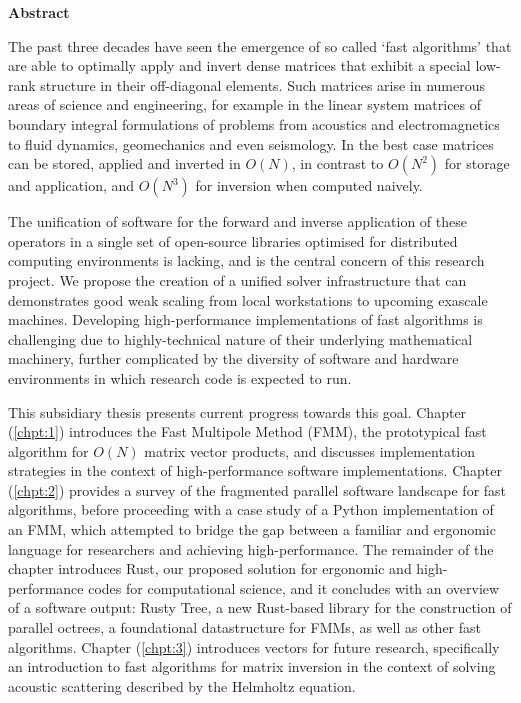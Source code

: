 \thispagestyle{plain}

\begin{center}
    \textbf{Abstract}
\end{center}

The past three decades have seen the emergence of so called `fast algorithms' that are able to optimally apply and invert dense matrices that exhibit a special low-rank structure in their off-diagonal elements. Such matrices arise in numerous areas of science and engineering, for example in the linear system matrices of boundary integral formulations of problems from acoustics and electromagnetics to fluid dynamics, geomechanics and even seismology. In the best case matrices can be stored, applied and inverted in $O(N)$, in contrast to $O(N^2)$ for storage and application, and $O(N^3)$ for inversion when computed naively.

The unification of software for the forward and inverse application of these operators in a single set of open-source libraries optimised for distributed computing environments is lacking, and is the central concern of this research project. We propose the creation of a unified solver infrastructure that can demonstrates good weak scaling from local workstations to upcoming exascale machines. Developing high-performance implementations of fast algorithms is challenging due to highly-technical nature of their underlying mathematical machinery, further complicated by the diversity of software and hardware environments in which research code is expected to run.

This subsidiary thesis presents current progress towards this goal. Chapter (\ref{chpt:1}) introduces the Fast Multipole Method (FMM), the prototypical fast algorithm for $O(N)$ matrix vector products, and discusses implementation strategies in the context of high-performance software implementations. Chapter (\ref{chpt:2}) provides a survey of the fragmented parallel software landscape for fast algorithms, before proceeding with a case study of a Python implementation of an FMM, which attempted to bridge the gap between a familiar and ergonomic language for researchers and achieving high-performance. The remainder of the chapter introduces Rust, our proposed solution for ergonomic and high-performance codes for computational science, and it concludes with an overview of a software output: Rusty Tree, a new Rust-based library for the construction of parallel octrees, a foundational datastructure for FMMs, as well as other fast algorithms. Chapter (\ref{chpt:3}) introduces vectors for future research, specifically an introduction to fast algorithms for matrix inversion in the context of solving acoustic scattering described by the Helmholtz equation.
